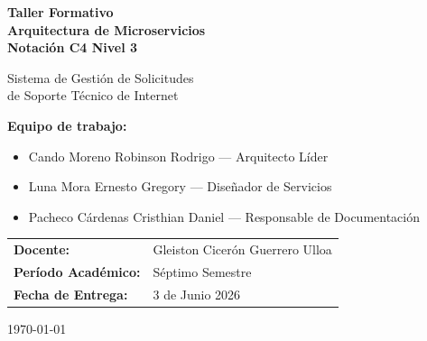 \documentclass[12pt,a4paper]{article}
\begin{document}
\begin{titlepage}
  \centering
  \vspace*{1.5cm}
  {\Large\bfseries\color{black}
    Taller Formativo\\[0.4em]
    Arquitectura de Microservicios\\[0.2em]
    Notación C4 Nivel 3\\[1.5cm]}

  {\large Sistema de Gestión de Solicitudes\\
   de Soporte Técnico de Internet\\[2cm]}

    \begin{flushleft}
        \textbf{Equipo de trabajo:}\\[0.4cm]
        \hspace{1cm}
        \begin{minipage}{0.85\textwidth}
            \begin{itemize}
                \setlength{\itemsep}{0.3cm}

                    \item Cando Moreno Robinson Rodrigo \quad --- \quad Arquitecto Líder            
                \item Luna Mora Ernesto Gregory \quad --- \quad Diseñador de Servicios

                \item Pacheco Cárdenas Cristhian Daniel \quad --- \quad Responsable de Documentación
            \end{itemize}
        \end{minipage}
    \end{flushleft}

    \vspace{1.5cm}

    \begin{flushleft}
        \hspace{1cm}
        \begin{tabular}{ll}
            \textbf{Docente:} & Gleiston Cicerón Guerrero Ulloa \\[0.3cm]
            \textbf{Período Académico:} & Séptimo Semestre \\[0.3cm]
            \textbf{Fecha de Entrega:} & 3 de Junio 2026 \\
        \end{tabular}
    \end{flushleft}

  \vfill
  {\small\color{gray600}\today}
\end{titlepage}
\end{document}

